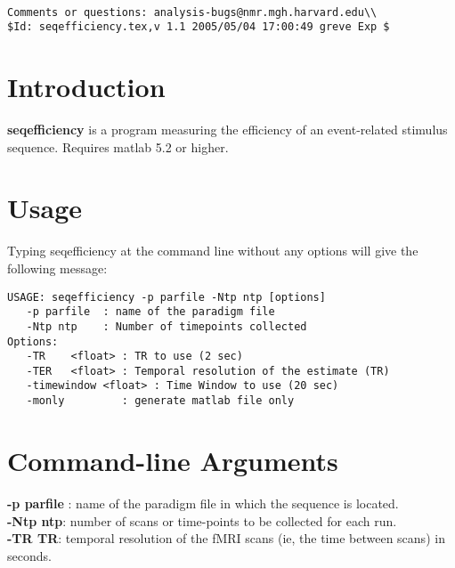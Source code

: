 \documentclass[10pt]{article}
\begin{document}
\begin{Large}
 \\
\end{Large}

\noindent 
\begin{verbatim}
Comments or questions: analysis-bugs@nmr.mgh.harvard.edu\\
$Id: seqefficiency.tex,v 1.1 2005/05/04 17:00:49 greve Exp $
\end{verbatim}

\section{Introduction}
{\bf seqefficiency} is a program measuring the efficiency of an
event-related stimulus sequence. Requires matlab 5.2 or higher.\\

\section{Usage}
Typing seqefficiency at the command line without any options will give the
following message:\\ 

\begin{small}
\begin{verbatim}
USAGE: seqefficiency -p parfile -Ntp ntp [options] 
   -p parfile  : name of the paradigm file
   -Ntp ntp    : Number of timepoints collected
Options:
   -TR    <float> : TR to use (2 sec)
   -TER   <float> : Temporal resolution of the estimate (TR)
   -timewindow <float> : Time Window to use (20 sec)
   -monly         : generate matlab file only
\end{verbatim}
\end{small}

\section{Command-line Arguments}

\noindent
{\bf -p parfile }: name of the paradigm file in which the sequence is
located. \\

\noindent
{\bf -Ntp ntp}: number of scans or time-points to be collected for
each run.\\

\noindent
{\bf -TR TR}: temporal resolution of the fMRI scans (ie, the time
between scans) in seconds.\\
\end{document}
